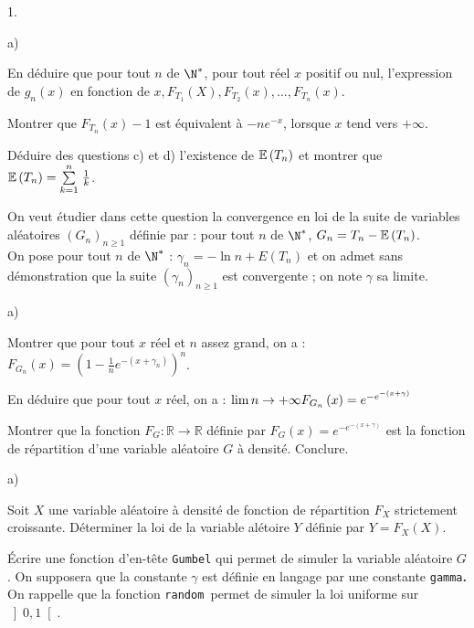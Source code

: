 \documentclass[11pt]{article}%
\begin{document}
\begin{noliste}{1.}
\begin{noliste}{a)}
\item En déduire que pour tout $n$ de $\N^{\ast }$, pour tout réel $x$
positif ou nul, l'expression de $g_{n}\left( x\right) $ en
fonction de $x,F_{T_{1}}\left( X\right),F_{T_{2}}\left(
x\right),...,F_{T_{n}}\left( x\right) $.

\item Montrer que $F_{T_{n}}\left( x\right) -1$ est équivalent à
$-ne^{-x}$, lorsque $x$ tend vers $ + \infty $.

\item Déduire des questions c) et d) l'existence de $\mathbb{E}\left(
T_{n}\right) $ et montrer que $\mathbb{E}\left( T_{n}\right) = {\textstyle\sum\limits_{k =
1}^{n}}\hspace{.1cm}\frac{1}{k}$.
\end{noliste}

\item On veut étudier dans cette question la convergence en loi de la
suite de variables aléatoires $\left( G_{n}\right)_{n\geq 1}$ définie
par : pour tout $n$ de $\N^{\ast }$, $G_{n} = T_{n}-\mathbb{E}\left(
T_{n}\right) $. \\
On pose pour tout $n$ de $\N^{\ast }$ : $\gamma_{n} = -\ln n + E\left(
T_{n}\right) $ et on admet sans démonstration que la suite $\left(
\gamma_{n}\right)_{n\geq 1}$ est convergente ; on note $\gamma $ sa
limite.

\begin{noliste}{a)}
 \setlength{\itemsep}{2mm}
\item Montrer que pour tout $x$ réel et $n$ assez grand, on a :
$F_{G_{n}}\left( x\right) = \left( 1-\frac{1}{n}e^{-\left( x + \gamma
_{n}\right) }\right) ^{n}$.

\item En déduire que pour tout $x$ réel, on a : $\lim{n\rightarrow +
\infty }F_{G_{n}}\left( x\right) = e^{-e^{-\left( x + \gamma
\right) }}$

\item Montrer que la fonction $F_{G} :\mathbb{R\rightarrow R}$ définie
par $F_{G}\left( x\right) = e^{-e^{-\left( x + \gamma \right) }}$ est
la
fonction de répartition d'une variable aléatoire $G$ à densité.
Conclure.
\end{noliste}

\item \label{d}

\begin{noliste}{a)}
 \setlength{\itemsep}{2mm}
\item Soit $X$ une variable aléatoire à densité de fonction de
répartition $F_{X}$ strictement croissante. Déterminer la loi de la
variable alétoire $Y$ définie par $Y = F_{X}\left( X\right) $.

\item Écrire une fonction \Scilab{} d'en-tête \texttt{Gumbel} qui
permet de
simuler la variable aléatoire $G$. On supposera que la constante
$\gamma 
$ est définie en langage \Scilab{} par une constante
\texttt{gamma}\textbf{. }On rappelle que la fonction \Scilab{}
\texttt{random }permet de simuler la
loi uniforme sur $\left] 0,1\right[ $.
\end{noliste}
\end{noliste}
\end{document}
